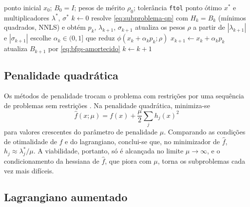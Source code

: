 \documentclass[12pt, oneside, a4paper, english, brazil]{abntex2}
\theoremstyle{relatorio}
\theoremstyle{relatorioit}
\theoremstyle{problema}
\newcommand{\code}[1]{{\renewcommand{\_}{\textunderscore\allowbreak}\texttt{#1}}}
\begin{document}
\begin{algorithm}[H]
\caption{SLSQP \parencite{kraft1988, nocedal2006}}
\label{alg:slsqp}
\begin{algorithmic}[1]
  \Require ponto inicial $x_0$; $B_0 = I$; pesos de mérito $\rho_0$; tolerância \code{ftol}
  \Ensure ponto ótimo $x^*$ e multiplicadores $\lambda^*$, $\sigma^*$
  \State $k \gets 0$
    \State resolve \eqref{eq:subproblema-qp} com $H_k = B_k$ (mínimos quadrados, NNLS) e obtém $p_k$, $\lambda_{k+1}$, $\sigma_{k+1}$
    \State atualiza os pesos $\rho$ a partir de $|\lambda_{k+1}|$ e $|\sigma_{k+1}|$
    \State escolhe $\alpha_k \in (0, 1]$ que reduz $\phi(x_k + \alpha_k p_k; \rho)$ 
    \State $x_{k+1} \gets x_k + \alpha_k p_k$
    \State atualiza $B_{k+1}$ por \eqref{eq:bfgs-amortecido} 
    \State $k \gets k + 1$
  \EndWhile
\end{algorithmic}
\end{algorithm}

\subsection{Penalidade quadrática}

Os métodos de penalidade trocam o problema com restrições por uma sequência de
problemas sem restrições \parencite[seção~5.4]{martins2021}. Na penalidade quadrática,
minimiza-se
\begin{equation}
  \hat f(x; \mu) = f(x) + \frac{\mu}{2} \sum_{j} h_j(x)^2
  \label{eq:penalidade}
\end{equation}
para valores crescentes do parâmetro de penalidade $\mu$. Comparando as condições de
otimalidade de $\hat f$ e do lagrangiano, conclui-se que, no minimizador de $\hat f$,
$h_j \approx \lambda_j^*/\mu$. A viabilidade, portanto, só é alcançada no limite
$\mu \to \infty$, e o condicionamento da hessiana de $\hat f$, que piora com $\mu$,
torna os subproblemas cada vez mais difíceis.

\subsection{Lagrangiano aumentado}
\label{sec:la}
\end{document}
